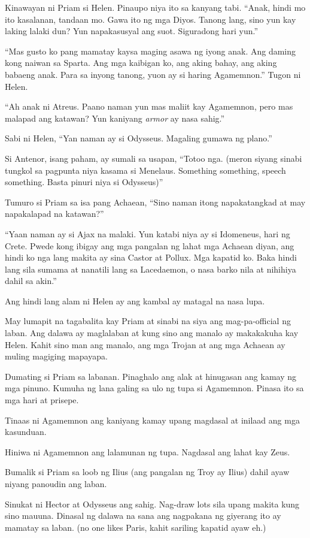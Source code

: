\documentclass[12pt,letterpaper]{report}
\begin{document}
Kinawayan ni Priam si Helen. Pinaupo niya ito sa kanyang tabi. ``Anak, hindi mo ito kasalanan, tandaan mo. Gawa ito ng mga Diyos. Tanong lang, sino yun kay laking lalaki dun? Yun napakasusyal ang suot. Siguradong hari yun.''

``Mas gusto ko pang mamatay kaysa maging asawa ng iyong anak. Ang daming kong naiwan sa Sparta. Ang mga kaibigan ko, ang aking bahay, ang aking babaeng anak. Para sa inyong tanong, yuon ay si haring Agamemnon.'' Tugon ni Helen.

``Ah anak ni Atreus. Paano naman yun mas maliit kay Agamemnon, pero mas malapad ang katawan? Yun kaniyang \textit{armor} ay nasa sahig.''

Sabi ni Helen, ``Yan naman ay si Odysseus. Magaling gumawa ng plano.''

Si Antenor, isang paham, ay sumali sa usapan, ``Totoo nga. (meron siyang sinabi tungkol sa pagpunta niya kasama si Menelaus. Something something, speech something. Basta pinuri niya si Odysseus)''

Tumuro si Priam sa isa pang Achaean, ``Sino naman itong napakatangkad at may napakalapad na katawan?''

``Yaan naman ay si Ajax na malaki. Yun katabi niya ay si Idomeneus, hari ng Crete. Pwede kong ibigay ang mga pangalan ng lahat mga Achaean diyan, ang hindi ko nga lang makita ay sina Castor at Pollux. Mga kapatid ko. Baka hindi lang sila sumama at nanatili lang sa Lacedaemon, o nasa barko nila at nihihiya dahil sa akin.''

Ang hindi lang alam ni Helen ay ang kambal ay matagal na nasa lupa.

May lumapit na tagabalita kay Priam at sinabi na siya ang mag-pa-official ng laban. Ang dalawa ay maglalaban at kung sino ang manalo ay makakakuha kay Helen. Kahit sino man ang manalo, ang mga Trojan at ang mga Achaean ay muling magiging mapayapa.

Dumating si Priam sa labanan. Pinaghalo ang alak at hinugasan ang kamay ng mga pinuno. Kumuha ng lana galing sa ulo ng tupa si Agamemnon. Pinasa ito sa mga hari at prisepe.

Tinaas ni Agamemnon ang kaniyang kamay upang magdasal at inilaad ang mga kasunduan.

Hiniwa ni Agamemnon ang lalamunan ng tupa. Nagdasal ang lahat kay Zeus.

Bumalik si Priam sa loob ng Ilius (ang pangalan ng Troy ay Ilius) dahil ayaw niyang panoudin ang laban.

Sinukat ni Hector at Odysseus ang sahig. Nag-draw lots sila upang makita kung sino mauuna. Dinasal ng dalawa na sana ang nagpakana ng giyerang ito ay mamatay sa laban. (no one likes Paris, kahit sariling kapatid ayaw eh.)
\end{document}

